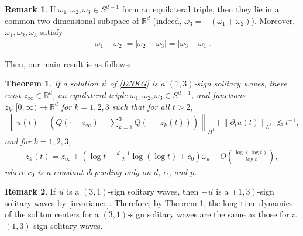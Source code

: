 \documentclass[reqno]{amsart}
\theoremstyle{plain}
\newtheorem{theorem}{Theorem}[section]
\theoremstyle{definition}
\newtheorem{remark}{Remark}[section]
\numberwithin{equation}{section}
\newcommand{\1}{\mathbbm{1}}
\begin{document}
\begin{remark}
If $\omega_1,\omega_2,\omega_3\in S^{d-1}$ form an equilateral triple, then they lie in a common
two-dimensional subspace of $\mathbb{R}^d$ (indeed, $\omega_3=-(\omega_1+\omega_2)$). 
Moreover, $\omega_1,\omega_2,\omega_3$ satisfy
\begin{align*}
|\omega_1-\omega_2|=|\omega_2-\omega_3|=|\omega_3-\omega_1|.
\end{align*}
\end{remark}

Then, our main result is as follows:
\begin{theorem}\label{maintheorem}
If a solution $\vec{u}$ of \eqref{DNKG} is a $(1,3)$-sign solitary waves, there exist $z_{\infty}\in \mathbb{R}^d$, an equilateral triple $\omega_1,\omega_2,\omega_3\in S^{d-1}$, and functions $z_k:[0,\infty)\to \mathbb{R}^d$ for $k=1,2,3$ such that for all $t>2$,
\begin{align}\label{3soli}
\left\| u(t)-\left(Q(\cdot-z_{\infty})-\sum_{k=1}^3 Q(\cdot-z_k(t))\right)\right\|_{H^1}+\|{\partial}_tu(t)\|_{L^2}\lesssim t^{-1},
\end{align}
and for $k=1,2,3$,
\begin{align}\label{zestheorem}
z_k(t)=z_{\infty}+\left( \log{t}-\frac{d-1}{2}\log{(\log{t})}+c_0\right)\omega_k+O\left(\frac{\log{(\log{t})}}{\log{t}}\right),
\end{align}
where $c_0$ is a constant depending only on $d,\ \alpha$, and $p$.
\end{theorem}
\begin{remark}
If $\vec{u}$ is a $(3,1)$-sign solitary waves, then $-\vec{u}$ is a $(1,3)$-sign solitary waves by \eqref{invariance}. Therefore, by Theorem \ref{maintheorem}, the long-time dynamics of the soliton centers for a $(3,1)$-sign solitary waves are the same as those for a $(1,3)$-sign solitary waves.
\end{remark}

\end{document}
